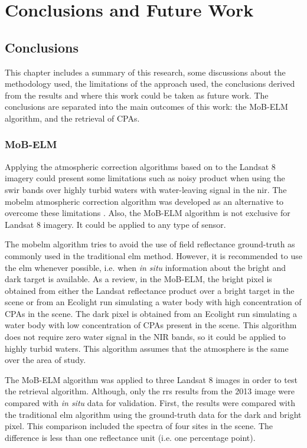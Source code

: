 \chapter{Conclusions and Future Work}
\label{ch:conc_future}
\section{Conclusions}
\label{sec:conc}
This chapter includes a summary of this research, some discussions about the methodology used, the limitations of the approach used, the conclusions derived from the results and where this work could be taken as future work. The conclusions are separated into the main outcomes of this work: the MoB-ELM algorithm, and the retrieval of CPAs.


\subsection{MoB-ELM}
Applying the atmospheric correction algorithms based on \citet{Gordon:1994} to the Landsat 8 imagery could present some limitations such as noisy product when using the \gls{swir} bands over highly turbid waters with water-leaving signal in the \gls{nir}. The \gls{mobelm} atmospheric correction algorithm was developed as an alternative to overcome these limitations \citep{Concha2014SPIE}. Also, the MoB-ELM algorithm is not exclusive for Landsat 8 imagery. It could be applied to any type of sensor.

The \gls{mobelm} algorithm tries to avoid the use of field reflectance ground-truth as commonly used in the traditional \gls{elm} method. However, it is recommended to use the \gls{elm} whenever possible, i.e. when {\it in situ} information about the bright and dark target is available. As a review, in the MoB-ELM, the bright pixel is obtained from either the Landsat reflectance product over a bright target in the scene or from an Ecolight run simulating a water body with high concentration of CPAs in the scene. The dark pixel is obtained from an Ecolight run simulating a water body with low concentration of CPAs present in the scene. This algorithm does not require zero water signal in the NIR bands, so it could be applied to highly turbid waters. This algorithm assumes that the atmosphere is the same over the area of study.

The MoB-ELM algorithm was applied to {three } Landsat 8 images in order to test the retrieval algorithm. Although, only the \gls{rrs} results from the 2013 image were compared with {\it in situ} data for validation. First, the results were compared with the traditional \gls{elm} algorithm using the ground-truth data for the dark and bright pixel. This comparison included the spectra of four sites in the scene. The difference is less than one reflectance unit (i.e. one percentage point). 

